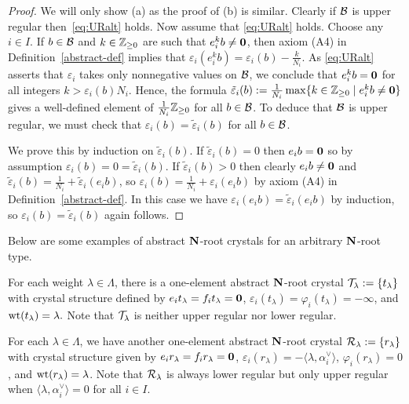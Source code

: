 \documentclass[11pt]{article}
\begin{document}
\begin{proof}
We will only show (a) as the proof of (b) is similar.
Clearly if $\mathcal{B}$ is upper regular then~\eqref{eq:URalt} holds.
Now assume that \eqref{eq:URalt} holds.
Choose any $i \in I$.
If $b \in \mathcal{B}$ and $k \in \mathbb{Z}_{\geq 0}$ are such that $e_i^kb\neq \boldsymbol{0}$, then 
axiom (A4) in Definition~\ref{abstract-def}
implies  that $\varepsilon_i(e_i^kb) = \varepsilon_i(b) - \frac{k}{N_i}$.
As \eqref{eq:URalt} asserts that $\varepsilon_i$ takes only nonnegative values on $\mathcal{B}$,
we conclude that   $e_i^kb= \boldsymbol{0}$ for all integers $k > \varepsilon_i(b) N_i$.
Hence, the formula $\tilde\varepsilon_i(b) := \tfrac{1}{N_i} \max\{ k \in \mathbb{Z}_{\geq 0} \mid e_i^k b \neq \boldsymbol{0}\}$ gives a well-defined element of $\frac{1}{N_i}\mathbb{Z}_{\geq 0}$ for all $b\in \mathcal{B}$.
To deduce that $\mathcal{B}$ is upper regular, we must check that $\varepsilon_i(b)=\tilde\varepsilon_i(b)$
for all  $b\in \mathcal{B}$.

We prove this by induction on $\tilde\varepsilon_i(b)$.
If $\tilde\varepsilon_i(b)=0$ then 
 $e_i b = \boldsymbol{0}$ so by assumption $\varepsilon_i(b) = 0=\tilde\varepsilon_i(b)$.
If $\tilde\varepsilon_i(b)>0$ then clearly
$e_ib \neq \boldsymbol{0}$
and  $\tilde\varepsilon_i(b) = \tfrac{1}{N_i} +\tilde\varepsilon_i(e_ib)$,
so
$\varepsilon_i(b) = \tfrac{1}{N_i} +\varepsilon_i(e_ib)$
by axiom (A4) in Definition~\ref{abstract-def}.
In this case we have $\varepsilon_i(e_ib)=\tilde\varepsilon_i(e_ib)$ by induction,
so $\varepsilon_i(b)=\tilde\varepsilon_i(b)$ again follows.
\end{proof}

Below are some examples of abstract $\mathbf{N}$-root crystals 
  for an arbitrary   $\mathbf{N}$-root type.

\begin{example}
\label{ex:Tla_crystal}
For each weight $\lambda \in \Lambda$, there is a one-element abstract $\mathbf{N}$-root crystal
$
\mathcal{T}_{\lambda} := \{t_{\lambda}\}
$
with crystal structure  defined  by
$
e_i t_{\lambda} = f_i t_{\lambda} = \boldsymbol{0}
$,
$
\varepsilon_i(t_{\lambda}) = \varphi_i(t_{\lambda}) = -\infty
$,
and
$\operatorname{wt}(t_{\lambda}) = \lambda.
$
Note that $\mathcal{T}_{\lambda}$ is neither upper regular nor lower regular. 
\end{example}

\begin{example}
\label{ex:Rla_crystal}
For each $\lambda \in \Lambda$, we have another one-element abstract $\mathbf{N}$-root crystal
$
\mathcal{R}_{\lambda} := \{r_{\lambda}\}
$
with crystal structure given by
$e_i r_{\lambda} = f_i r_{\lambda} = \boldsymbol{0}$,
$\varepsilon_i(r_{\lambda}) = - \langle \lambda, \alpha_i^{\vee} \rangle$,
$\varphi_i(r_{\lambda}) = 0$,
and
$\operatorname{wt}(r_{\lambda}) = \lambda$.
Note that $\mathcal{R}_{\lambda}$ is always lower regular but only upper regular when $ \langle \lambda, \alpha_i^{\vee} \rangle=0$ for all $i \in I$.
\end{example}
\end{document}
